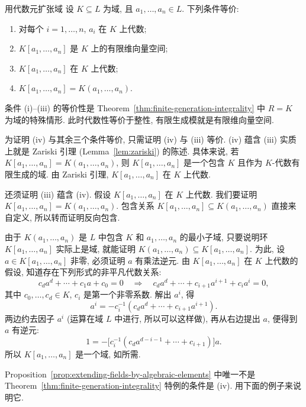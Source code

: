 \begin{Proposition}{用代数元扩张域}\leavevmode\label{prop:extending-fields-by-algebraic-elements}
设 $K\subseteq L$ 为域, 且 $a_{1},\ldots,a_{n}\in L$. 下列条件等价:
\begin{enumerate}
  \item[(i)] 对每个 $i=1,\ldots,n$, $a_{i}$ 在 $K$ 上代数;
  \item[(ii)] $K[a_{1},\ldots,a_{n}]$ 是 $K$ 上的有限维向量空间;
  \item[(iii)] $K[a_{1},\ldots,a_{n}]$ 在 $K$ 上代数;
  \item[(iv)] $K[a_{1},\ldots,a_{n}]=K(a_{1},\ldots,a_{n})$.
\end{enumerate}
\end{Proposition}
\begin{Proof}
条件 (i)--(iii) 的等价性是 Theorem~\ref{thm:finite-generation-integrality} 中 $R=K$ 为域的特殊情形. 此时代数性等价于整性, 有限生成模就是有限维向量空间.

为证明 (iv) 与其余三个条件等价, 只需证明 (iv) 与 (iii) 等价. (iv) 蕴含 (iii) 实质上就是 Zariski 引理 (Lemma~\ref{lem:zariski}) 的陈述. 具体来说, 若 $K[a_{1},\ldots,a_{n}]=K(a_{1},\ldots,a_{n})$, 则 $K[a_{1},\ldots,a_{n}]$ 是一个包含 $K$ 且作为 $K$-代数有限生成的域. 由 Zariski 引理, $K[a_{1},\ldots,a_{n}]$ 在 $K$ 上代数.

还须证明 (iii) 蕴含 (iv). 假设 $K[a_{1},\ldots,a_{n}]$ 在 $K$ 上代数. 我们要证明 $K[a_{1},\ldots,a_{n}]=K(a_{1},\ldots,a_{n})$. 包含关系 $K[a_{1},\ldots,a_{n}]\subseteq K(a_{1},\ldots,a_{n})$ 直接来自定义, 所以转而证明反向包含.

由于 $K(a_{1},\ldots,a_{n})$ 是 $L$ 中包含 $K$ 和 $a_{1},\ldots,a_{n}$ 的最小子域, 只要说明环 $K[a_{1},\ldots,a_{n}]$ 实际上是域, 就能证明 $K(a_{1},\ldots,a_{n})\subseteq K[a_{1},\ldots,a_{n}]$. 为此, 设 $a\in K[a_{1},\ldots,a_{n}]$ 非零, 必须证明 $a$ 有乘法逆元. 由 $K[a_{1},\ldots,a_{n}]$ 在 $K$ 上代数的假设, 知道存在下列形式的非平凡代数关系:
\[
  c_{d}a^{d}+\cdots+c_{1}a+c_{0}=0
    \quad\Longrightarrow\quad c_{d}a^{d}+\cdots+c_{i+1}a^{i+1}+c_{i}a^{i}=0,
\]
其中 $c_{0},\ldots,c_{d}\in K$, $c_{i}$ 是第一个非零系数. 解出 $a^{i}$, 得
\[
  a^{i}=-c_{i}^{-1}(c_{d}a^{d}+\cdots+c_{i+1}a^{i+1}).
\]
两边约去因子 $a^{i}$ (运算在域 $L$ 中进行, 所以可以这样做), 再从右边提出 $a$, 便得到 $a$ 有逆元:
\[
  1=-\bigl[c_{i}^{-1}(c_{d}a^{d-i-1}+\cdots+c_{i+1})\bigr]a.
\]
所以 $K[a_{1},\ldots,a_{n}]$ 是一个域, 如所需.
\end{Proof}

Proposition~\ref{prop:extending-fields-by-algebraic-elements} 中唯一不是 Theorem~\ref{thm:finite-generation-integrality} 特例的条件是 (iv). 用下面的例子来说明它.

